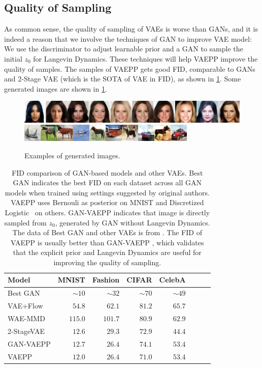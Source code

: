 \subsection{Quality of Sampling}
As common sense, the quality of sampling of VAEs is worse than GANs, and it is indeed a reason that we involve the techniques of GAN to improve VAE model: We use the discriminator to adjust learnable prior and a GAN to sample the initial $z_0$ for Langevin Dynamics. These techniques will help VAEPP improve the quality of samples. The samples of VAEPP gets good FID, comparable to GANs and 2-Stage VAE (which is the SOTA of VAE in FID), as shown in \cref{tab:compare_FID}. Some generated images are shown in \cref{fig:show_images}.
\begin{figure}[tb]
	\centering
	\includegraphics[width=1.0\columnwidth]{../figures/celeba}
	\includegraphics[width=1.0\columnwidth]{../figures/cifar}
	\caption{
		Examples of generated images.
	}
	\label{fig:show_images}
\end{figure}
\begin{table}[tb]
\centering
\begin{tabular}{lrrrrrrr}  
\toprule
Model & MNIST & Fashion & CIFAR & CelebA\\
\midrule
Best GAN   & $\sim10$& $\sim32$&$\sim70$& $\sim49$\\
VAE+Flow   & $54.8$  & $62.1$  & $81.2$ & $65.7$\\
WAE-MMD    & $115.0$ & $101.7$ & $80.9$ & $62.9$\\
2-StageVAE & $12.6$  & $29.3$  & $72.9$ & $44.4$\\
GAN-VAEPP  & $12.7$  & $26.4$  & $74.1$ & $53.4$ \\
VAEPP      & $12.0$  & $26.4$  & $71.0$ & $53.4$ \\
\bottomrule
\end{tabular} 
\caption{FID comparison of GAN-based models and other VAEs. Best GAN indicates the best FID on each dataset across all GAN models when trained using settings suggested by original authors. VAEPP uses Bernouli as posterior on MNIST and Discretized Logistic~\protect\cite{salimans2017pixelcnn++} on others. GAN-VAEPP indicates that image is directly sampled from $z_0$, generated by GAN without Langevin Dynamics. The data of Best GAN and other VAEs is from \protect\cite{dai2019diagnosing}. The FID of VAEPP is usually better than GAN-VAEPP 
, which validates that the explicit prior and Langevin Dynamics are useful for improving the quality of sampling.
}\label{tab:compare_FID}
\end{table}

